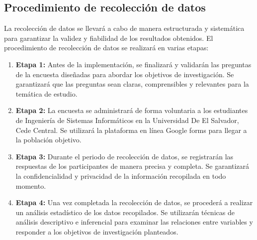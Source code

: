 \documentclass[journal]{IEEEtran}
\begin{document}
\subsection{Procedimiento de recolección de datos}
La recolección de datos se llevará a cabo de manera estructurada y sistemática para garantizar la validez y fiabilidad de los resultados obtenidos. El procedimiento de recolección de datos se realizará en varias etapas:

\begin{enumerate}
	\item \textbf{Etapa 1:} Antes de la implementación, se finalizará y validarán las preguntas de la encuesta diseñadas para abordar los objetivos de investigación. Se garantizará que las preguntas sean claras, comprensibles y relevantes para la temática de estudio.
	\item \textbf{Etapa 2:} La encuesta se administrará de forma voluntaria a los estudiantes de Ingeniería de Sistemas Informáticos en la Universidad De El Salvador, Cede Central. Se utilizará la plataforma en línea Google forms para llegar a la población objetivo.
	\item \textbf{Etapa 3:} Durante el periodo de recolección de datos, se registrarán las respuestas de los participantes de manera precisa y completa. Se garantizará la confidencialidad y privacidad de la información recopilada en todo momento.
	\item \textbf{Etapa 4:} Una vez completada la recolección de datos, se procederá a realizar un análisis estadístico de los datos recopilados. Se utilizarán técnicas de análisis descriptivo e inferencial para examinar las relaciones entre variables y responder a los objetivos de investigación planteados. 
\end{enumerate}
\end{document}
